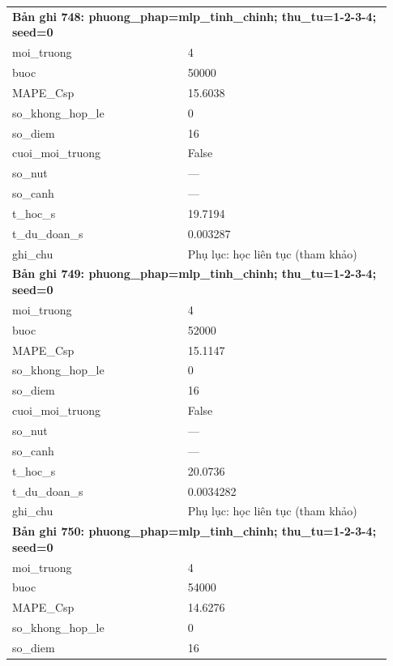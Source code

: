 \begin{longtable}{p{0.43\linewidth}p{0.50\linewidth}}
\midrule
\multicolumn{2}{p{0.95\linewidth}}{\textbf{Bản ghi 748: phuong\_phap=mlp\_tinh\_chinh; thu\_tu=1-2-3-4; seed=0}} \\
moi\_\allowbreak truong & 4 \\
buoc & 50000 \\
MAPE\_\allowbreak Csp & 15.6038 \\
so\_\allowbreak khong\_\allowbreak hop\_\allowbreak le & 0 \\
so\_\allowbreak diem & 16 \\
cuoi\_\allowbreak moi\_\allowbreak truong & False \\
so\_\allowbreak nut & — \\
so\_\allowbreak canh & — \\
t\_\allowbreak hoc\_\allowbreak s & 19.7194 \\
t\_\allowbreak du\_\allowbreak doan\_\allowbreak s & 0.003287 \\
ghi\_\allowbreak chu & Phụ lục: học liên tục (tham khảo) \\
\midrule
\multicolumn{2}{p{0.95\linewidth}}{\textbf{Bản ghi 749: phuong\_phap=mlp\_tinh\_chinh; thu\_tu=1-2-3-4; seed=0}} \\
moi\_\allowbreak truong & 4 \\
buoc & 52000 \\
MAPE\_\allowbreak Csp & 15.1147 \\
so\_\allowbreak khong\_\allowbreak hop\_\allowbreak le & 0 \\
so\_\allowbreak diem & 16 \\
cuoi\_\allowbreak moi\_\allowbreak truong & False \\
so\_\allowbreak nut & — \\
so\_\allowbreak canh & — \\
t\_\allowbreak hoc\_\allowbreak s & 20.0736 \\
t\_\allowbreak du\_\allowbreak doan\_\allowbreak s & 0.0034282 \\
ghi\_\allowbreak chu & Phụ lục: học liên tục (tham khảo) \\
\midrule
\multicolumn{2}{p{0.95\linewidth}}{\textbf{Bản ghi 750: phuong\_phap=mlp\_tinh\_chinh; thu\_tu=1-2-3-4; seed=0}} \\
moi\_\allowbreak truong & 4 \\
buoc & 54000 \\
MAPE\_\allowbreak Csp & 14.6276 \\
so\_\allowbreak khong\_\allowbreak hop\_\allowbreak le & 0 \\
so\_\allowbreak diem & 16 \\

\end{longtable}
